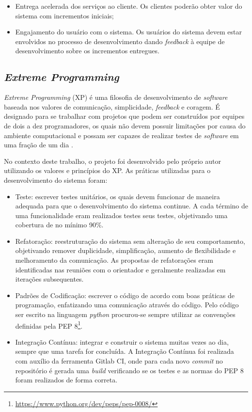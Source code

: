 \begin{itemize}
    \item Entrega acelerada dos serviços ao cliente. Os clientes poderão obter valor do sistema com incrementos iniciais;
    \item Engajamento do usuário com o sistema. Os usuários do sistema devem estar envolvidos no processo
    de desenvolvimento dando \textit{feedback} à equipe de desenvolvimento sobre os incrementos entregues.
\end{itemize}

    \subsection{\textit{Extreme Programming}}
    \textit{Extreme Programming} (XP) é uma filosofia de desenvolvimento de \textit{software} baseada nos valores de comunicação, simplicidade, \textit{feedback} e coragem. É designado para se trabalhar com projetos que podem ser
    construídos por equipes de dois a dez programadores, os quais não devem possuir limitações
    por causa do ambiente computacional e possam ser capazes de realizar testes de
    \textit{software} em uma fração de um dia \cite{beck_2004}.

    No contexto deste trabalho, o projeto foi desenvolvido pelo próprio autor utilizando os valores e princípios do XP. As práticas utilizadas para o desenvolvimento do sistema foram:

    \begin{itemize}
        \item Teste: escrever testes unitários, os quais devem funcionar de maneira adequada para que
        o desenvolvimento do sistema continue. A cada término de uma funcionalidade eram realizados testes
        seus testes, objetivando uma cobertura de no mínimo 90\%.
        \item Refatoração: reestruturação do sistema sem alteração de seu comportamento, objetivando
        remover duplicidade, simplificação, aumento de flexibilidade e melhoramento da comunicação. As propostas de refatorações eram identificadas nas reuniões com o orientador
        e geralmente realizadas em iterações subsequentes.
        \item Padrões de Codificação: escrever o código de acordo com boas práticas de programação, enfatizando uma comunicação através do código. Pelo código ser escrito na linguagem \textit{python}
        procurou-se sempre utilizar as convenções definidas pela PEP 8\footnote{\url{https://www.python.org/dev/peps/pep-0008/}}.
        \item Integração Contínua: integrar e construir o sistema muitas vezes ao dia, sempre que uma tarefa
        for concluída. A Integração Contínua foi realizada com auxílio da ferramenta Gitlab CI, onde para cada novo \textit{commit} no repositório é gerada uma \textit{build} verificando se os testes e as normas do PEP 8 foram realizados de forma correta.
    \end{itemize}

